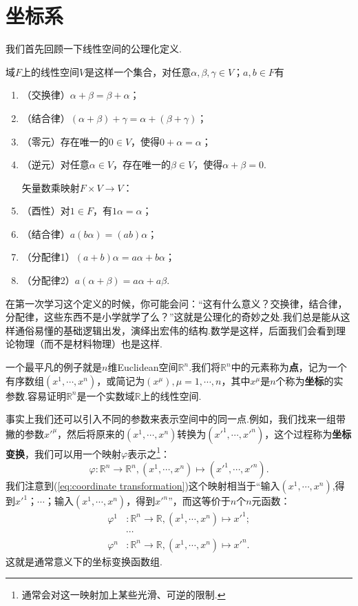 \section{坐标系}\label{sec:Coordinates}
	我们首先回顾一下线性空间的公理化定义.
		\begin{definition}
			域$F$上的线性空间$V$是这样一个集合，对任意$\alpha,\beta,\gamma\in V$；$a,b\in F$有
			\begin{enumerate}
				矢量加法映射$V\times V\rightarrow V$：
				\item （交换律）$\alpha+\beta=\beta+\alpha$；
				\item （结合律）$(\alpha+\beta)+\gamma=\alpha+(\beta+\gamma)$；
				\item （零元）存在唯一的$0\in V$，使得$0+\alpha=\alpha$；
				\item （逆元）对任意$\alpha\in V$，存在唯一的$\beta\in V$，使得$\alpha+\beta=0$.
					
				矢量数乘映射$F\times V\rightarrow V$：
				\item （酉性）对$1\in F$，有$1\alpha=\alpha$；
				\item （结合律）$a(b\alpha)=(ab)\alpha$；
				\item （分配律1）$(a+b)\alpha=a\alpha+b\alpha$；
				\item （分配律2）$a(\alpha+\beta)=a\alpha+a\beta$.
			\end{enumerate}
		\end{definition}
	在第一次学习这个定义的时候，你可能会问：“这有什么意义？交换律，结合律，分配律，这些东西不是小学就学了么？”这就是公理化的奇妙之处.我们总是能从这样通俗易懂的基础逻辑出发，演绎出宏伟的结构.数学是这样，后面我们会看到理论物理（而不是材料物理）也是这样.
			
	一个最平凡的例子就是$n$维Euclidean空间$\mathbb{R}^n$.我们将$\mathbb{R}^n$中的元素称为\textbf{点}，记为一个有序数组$(x^1,\cdots,x^n)$，或简记为$(x^\mu),\mu=1,\cdots,n$，其中$x^\mu$是$n$个称为\textbf{坐标}的实参数.容易证明$\mathbb{R}^n$是一个实数域$\mathbb{R}$上的线性空间.
			
	事实上我们还可以引入不同的参数来表示空间中的同一点.例如，我们找来一组带撇的参数$x'^\mu$，然后将原来的$(x^1,\cdots,x^n)$转换为$(x'^1,\cdots,x'^n)$，这个过程称为\textbf{坐标变换}，我们可以用一个映射$\varphi$表示之\footnote{通常会对这一映射加上某些光滑、可逆的限制.}：
	\begin{equation}\label{eq:coordinate transformation}
		\varphi:\mathbb{R}^n\rightarrow \mathbb{R}^n,(x^1,\cdots,x^n)\mapsto (x'^1,\cdots,x'^n).
	\end{equation}
	我们注意到(\ref{eq:coordinate transformation})这个映射相当于“输入$(x^1,\cdots,x^n)$,得到$x'^1$；$\cdots$；输入$(x^1,\cdots,x^n)$，得到$x'^n$”，而这等价于$n$个$n$元函数：
	\begin{equation}
		\begin{split}
			\varphi^1&:\mathbb{R}^n\rightarrow \mathbb{R},(x^1,\cdots,x^n)\mapsto x'^1;\\
			&\cdots\\
			\varphi^n&:\mathbb{R}^n\rightarrow \mathbb{R},(x^1,\cdots,x^n)\mapsto x'^n.
		\end{split}
	\end{equation}
	这就是通常意义下的坐标变换函数组.
			
